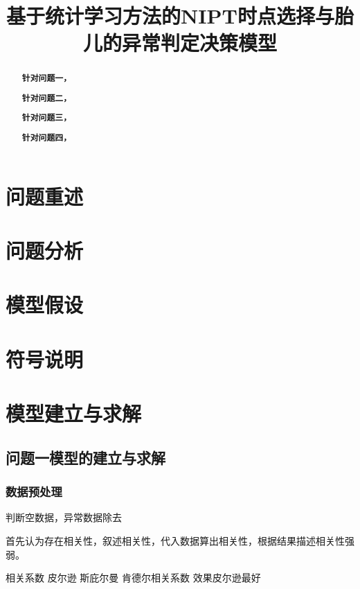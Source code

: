 \documentclass[withoutpreface,bwprint]{cumcmthesis} %
\title{基于统计学习方法的NIPT时点选择与胎儿的异常判定决策模型}
\begin{document}
\maketitle
\nocite{*}


\begin{abstract}

    \textbf{针对问题一，}

    \textbf{针对问题二，}

    \textbf{针对问题三，}

    \textbf{针对问题四，}

    \keywords{}
\end{abstract}

\section{问题重述}

\section{问题分析}


\section{模型假设}




\section{符号说明}


\section{模型建立与求解}

\subsection{问题一模型的建立与求解}
\subsubsection{数据预处理}
判断空数据，异常数据除去

首先认为存在相关性，叙述相关性，代入数据算出相关性，根据结果描述相关性强弱。

相关系数 皮尔逊 斯庇尔曼 肯德尔相关系数 效果皮尔逊最好 
\end{document}
